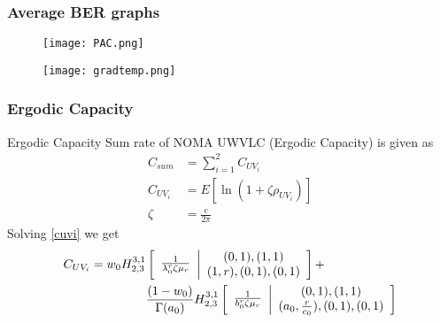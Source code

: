 \documentclass{beamer}
\providecommand{\sbrak}[1]{\ensuremath{{}\left[#1\right]}}
\begin{document}
\begin{frame}
\frametitle{Average BER graphs}
\begin{figure}[htb!]
\begin{center}
\texttt{[image: PAC.png]}
\end{center}
\end{figure}

\begin{figure}[htb!]
\begin{center}
\texttt{[image: gradtemp.png]}
\end{center}
\end{figure}
\end{frame}







\begin{frame}
\frametitle{Ergodic Capacity}
\begin{block}{Ergodic Capacity}
Sum rate of NOMA UWVLC (Ergodic Capacity) is given as
\begin{align}
C_{sum} &= \sum_{i=1}^2 C_{UV_i} \label{ec} \\
C_{UV_i} &= E[\ln{(1+\zeta \rho_{UV_i})}] \label{cuvi} \\
\zeta &= \frac{e}{2 \pi}
\end{align}
Solving \eqref{cuvi} we get 
\begin{align}
C_{UV_i}  = {w_0}H^{3,1}_{2,3} & \sbrak{\begin{array}{c}
\frac{1}{\lambda_0^r \zeta \mu_r}
\end{array} \middle \vert
\begin{array}{c}
(0,1),(1,1) \\
(1,r),(0,1) ,(0,1)
\end{array} }  + \notag \\ 
& \frac{(1-w_0)}{\Gamma(a_0)} H^{3,1}_{2,3} \sbrak{\begin{array}{c}
\frac{1}{b_0^r \zeta \mu_r}
\end{array} \middle \vert
\begin{array}{c}
(0,1),(1,1) \\
(a_0,\frac{r}{c_0}),(0,1) ,(0,1) 
\end{array} } 
\end{align}
\end{block}
\end{frame}
\end{document}
